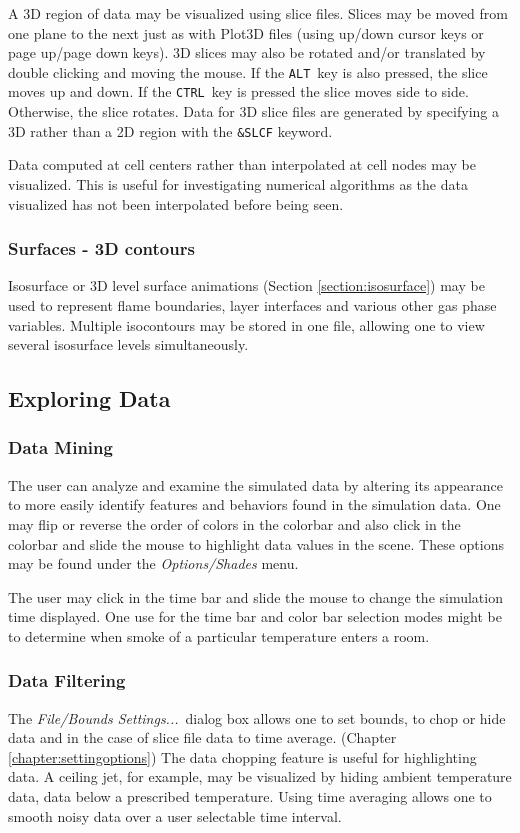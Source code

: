 \documentclass[11pt,twoside]{book}
\begin{document}
A 3D region of
data may be visualized using slice files.  Slices may be moved from one plane to
the next just as with Plot3D files (using up/down cursor keys or
page up/page down keys).
3D slices may also be rotated and/or translated by double clicking and
moving the mouse. If the {\tt ALT}\ key
is also pressed, the slice moves up and down.
If the {\tt CTRL}\ key is pressed the slice moves side to side.
Otherwise, the slice rotates.
Data for 3D slice files are generated by specifying a 3D rather than a
2D region with the {\tt \&SLCF} keyword.

Data computed at cell centers rather than interpolated at cell nodes may be visualized.
This is useful for investigating numerical algorithms as the data visualized
has not been interpolated before being seen.

\subsubsection{Surfaces - 3D contours}
Isosurface or 3D level surface animations (Section
\ref{section:isosurface}) may be used to represent flame
boundaries, layer interfaces and various other gas phase
variables. Multiple isocontours may be stored in one file,
allowing one to view several isosurface levels simultaneously.


\subsection{Exploring Data}

\subsubsection{Data Mining} The user can analyze and examine the simulated
data by altering its appearance to more easily identify features
and behaviors found in the simulation data. One may flip or
reverse the order of colors in the colorbar and also click in the
colorbar and slide the mouse to highlight data values in the
scene. These options may be found under the {\em Options/Shades}
menu.

The user may click in the time bar and slide the mouse to
change the simulation time displayed. One use for the time
bar and color bar selection modes might be to determine
when smoke of a particular temperature enters a room.

\subsubsection{Data Filtering} The {\em File/Bounds Settings...}\
dialog box allows one to set bounds, to chop or hide data and in the case
of slice file data to time average. (Chapter \ref{chapter:settingoptions})
The data chopping
feature is useful for highlighting data.  A ceiling jet, for example,
may be visualized by hiding ambient temperature
data,  data below a prescribed temperature.
Using time averaging allows one to smooth noisy data over a user selectable time
interval.
\end{document}
